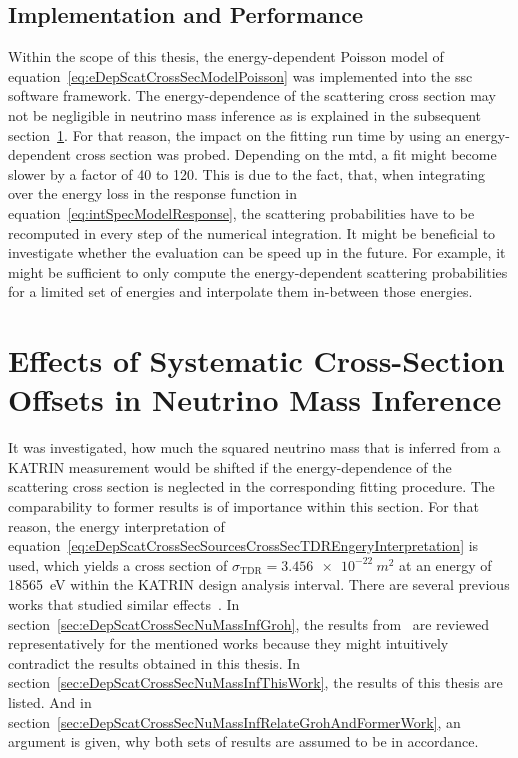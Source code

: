 \subsection{Implementation and Performance}
Within the scope of this thesis, the energy-dependent Poisson model of equation~\eqref{eq:eDepScatCrossSecModelPoisson} was implemented into the \gls{ssc} software framework. The energy-dependence of the scattering cross section may not be negligible in neutrino mass inference as is explained in the subsequent section~\ref{sec:eDepScatCrossSecNuMassInf}. For that reason, the impact on the fitting run time by using an energy-dependent cross section was probed. Depending on the \gls{mtd}, a fit might become slower by a factor of 40 to 120. This is due to the fact, that, when integrating over the energy loss in the response function in equation~\eqref{eq:intSpecModelResponse}, the scattering probabilities have to be recomputed in every step of the numerical integration. It might be beneficial to investigate whether the evaluation can be speed up in the future. For example, it might be sufficient to only compute the energy-dependent scattering probabilities for a limited set of energies and interpolate them in-between those energies.

\section{Effects of Systematic Cross-Section Offsets in Neutrino Mass Inference}
\label{sec:eDepScatCrossSecNuMassInf}
It was investigated, how much the squared neutrino mass that is inferred from a KATRIN measurement would be shifted if the energy-dependence of the scattering cross section is neglected in the corresponding fitting procedure. The comparability to former results is of importance within this section. For that reason, the energy interpretation of equation~\eqref{eq:eDepScatCrossSecSourcesCrossSecTDREngeryInterpretation} is used, which yields a cross section of $\sigma_\mathrm{TDR}=\SI{3.456e-22}{m^2}$ at an energy of \SI{18565}{eV} within the KATRIN design analysis interval. There are several previous works that studied similar effects~\cite{Antoni2015,Groh2015,SeitzM2019,Kuckert2016,Kuckert2018}. In section~\ref{sec:eDepScatCrossSecNuMassInfGroh}, the results from~\cite{Groh2015} are reviewed representatively for the mentioned works because they might intuitively contradict the results obtained in this thesis. In section~\ref{sec:eDepScatCrossSecNuMassInfThisWork}, the results of this thesis are listed. And in section~\ref{sec:eDepScatCrossSecNuMassInfRelateGrohAndFormerWork}, an argument is given, why both sets of results are assumed to be in accordance.

